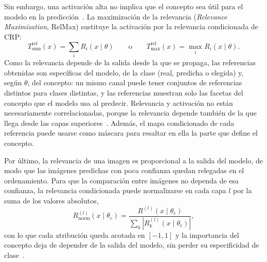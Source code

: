 Sin embargo, una activación alta no implica que el concepto sea útil para el modelo
en la predicción~\cite{achtibat2023}. La maximización de la relevancia
(\emph{Relevance Maximization}, RelMax) sustituye la activación por la relevancia
condicionada de CRP:
\begin{equation}\label{eq:crp-relmax}
  T^{\mathrm{rel}}_{\mathrm{sum}}(x) = \sum_{i} R_i(x \mid \theta)
  \qquad\text{o}\qquad
  T^{\mathrm{rel}}_{\mathrm{max}}(x) = \max_{i} R_i(x \mid \theta).
\end{equation}
Como la relevancia depende de la salida desde la que se propaga, las referencias
obtenidas son específicas del modelo, de la clase (real, predicha o elegida) y,
según $\theta$, del concepto: un mismo canal puede tener conjuntos de referencias
distintos para clases distintas, y las referencias muestran solo las facetas del
concepto que el modelo usa al predecir. Relevancia y activación no están
necesariamente correlacionadas, porque la relevancia depende también de la que llega
desde las capas superiores~\cite{achtibat2023}. Además, el mapa condicionado de cada
referencia puede usarse como máscara para resaltar en ella la parte que define el
concepto.

Por último, la relevancia de una imagen es proporcional a la salida del modelo, de
modo que las imágenes predichas con poca confianza quedan relegadas en el
ordenamiento. Para que la comparación entre imágenes no dependa de esa confianza, la
relevancia condicionada puede normalizarse en cada capa $l$ por la suma de los
valores absolutos,
\begin{equation}\label{eq:crp-normalizacion}
  R^{(l)}_{\mathrm{norm}}(x \mid \theta_c)
  = \frac{R^{(l)}(x \mid \theta_c)}{\sum_{k} \left| R^{(l)}_{k}(x \mid \theta_c) \right|},
\end{equation}
con lo que cada atribución queda acotada en $[-1, 1]$ y la importancia del concepto
deja de depender de la salida del modelo, sin perder su especificidad de
clase~\cite{achtibat2023}.


\endinput
